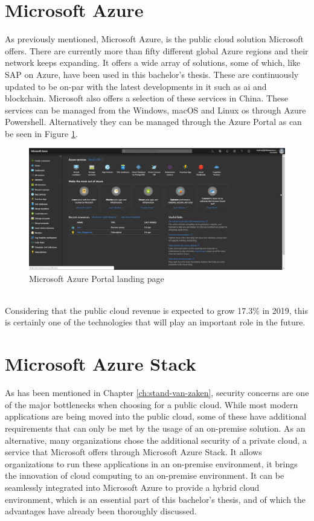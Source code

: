 \section{Microsoft Azure}
As previously mentioned, Microsoft Azure, is the public cloud solution Microsoft offers. 
There are currently more than fifty different global Azure regions and their network keeps expanding. 
It offers a wide array of solutions, some of which, like SAP on Azure, have been used in this bachelor's thesis. 
These are continuously updated to be on-par with the latest developments in \acrshort{it} such as \acrfull{ai} and blockchain. 
Microsoft also offers a selection of these services in China. 
These services can be managed from the Windows, macOS  and Linux \acrshort{os} through Azure Powershell. 
Alternatively they can be managed through the Azure Portal as can be seen in Figure \ref{fig:Azure_Portal}.

\begin{figure}[h]
	\captionsetup{width=0.8\linewidth}
	\includegraphics[width=0.9\linewidth]{img/Toekomstvisie/Azure0.png}
	\centering
	\caption[Azure Portal]{Microsoft Azure Portal landing page}
	\label{fig:Azure_Portal}
\end{figure}
\\
Considering that the public cloud revenue is expected to grow 17.3\% in 2019, this is certainly one of the technologies that will play an important role in the future.\autocite{Ng2018}

\section{Microsoft Azure Stack}
As has been mentioned in Chapter \ref{ch:stand-van-zaken}, security concerns are one of the major bottlenecks when choosing for a public cloud. 
While most modern applications are being moved into the public cloud, some of these have additional requirements that can only be met by the usage of an on-premise solution. 
As an alternative, many organizations chose the additional security of a private cloud, a service that Microsoft offers through Microsoft Azure Stack. 
It allows organizations to run these applications in an on-premise environment, it brings the innovation of cloud computing to an on-premise environment.
It can be seamlessly integrated into Microsoft Azure to provide a hybrid cloud environment, which is an essential part of this bachelor's thesis, and of which the advantages have already been thoroughly discussed.


